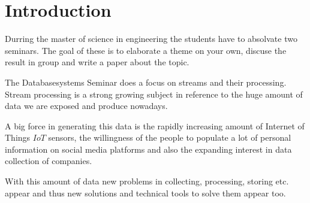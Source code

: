 \chapter{Introduction}
\label{introduction}

Durring the master of science in engineering the students have to absolvate two seminars.
The goal of these is to elaborate a theme on your own, discuse the result in group and write a paper about the topic.

The Databasesystems Seminar does a focus on streams and their processing.
Stream processing is a strong growing subject in reference to the huge amount of data we are exposed and produce nowadays.

A big force in generating this data is the rapidly increasing amount of Internet of Things \(IoT\) sensors,
the willingness of the people to populate a lot of personal information on social media platforms and
also the expanding interest in data collection of companies.

With this amount of data new problems in collecting, processing, storing etc. appear
and thus new solutions and technical tools to solve them appear too.
